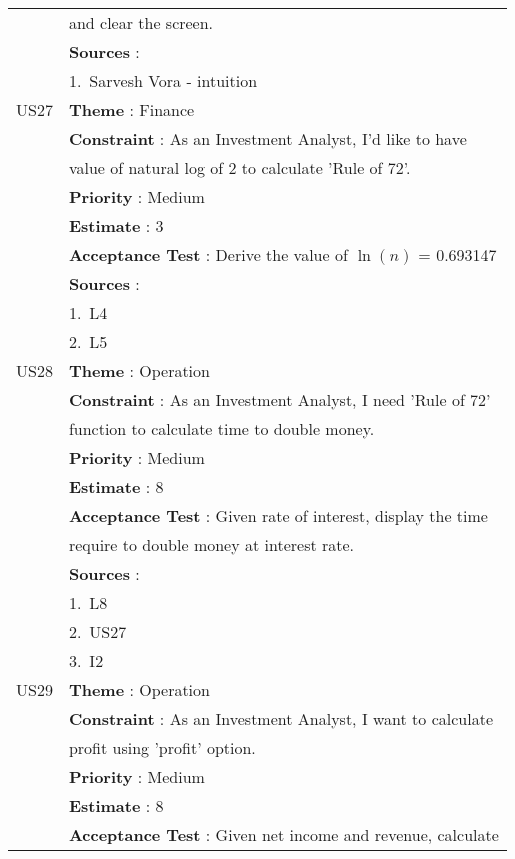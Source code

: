 \documentclass{article}
\begin{document}
\begin{longtable}{|| c || l ||}
         & and clear the screen.\\
         & \textbf{Sources} : \\
         & 1.~Sarvesh Vora - intuition \\
         \hline
         \hline
         US27 & \textbf{Theme} : Finance \\
         & \textbf{Constraint} : As an Investment Analyst, I'd like to have \\
         & value of natural log of 2 to calculate 'Rule of 72'.\\
         & \textbf{Priority} : Medium \\
         & \textbf{Estimate} : 3 \\
         & \textbf{Acceptance Test} : Derive the value of $\ln(n)$ = 0.693147\\
         & \textbf{Sources} : \\
         & 1.~L4\\
         & 2.~L5\\
         \hline
         US28 & \textbf{Theme} : Operation \\
         & \textbf{Constraint} : As an Investment Analyst, I need 'Rule of 72' \\
         & function to calculate time to double money.\\
         & \textbf{Priority} : Medium \\
         & \textbf{Estimate} : 8 \\
         & \textbf{Acceptance Test} : Given rate of interest, display the time\\
         & require to double money at interest rate.\\
         & \textbf{Sources} : \\
         & 1.~L8\\
         & 2.~US27\\
         & 3.~I2 \\
         \hline
         \newpage
         \hline
         US29 & \textbf{Theme} : Operation \\
         & \textbf{Constraint} : As an Investment Analyst, I want to calculate \\
         & profit using 'profit' option.\\
         & \textbf{Priority} : Medium \\
         & \textbf{Estimate} : 8 \\
         & \textbf{Acceptance Test} : Given net income and revenue, calculate\\

\end{longtable}
\end{document}
